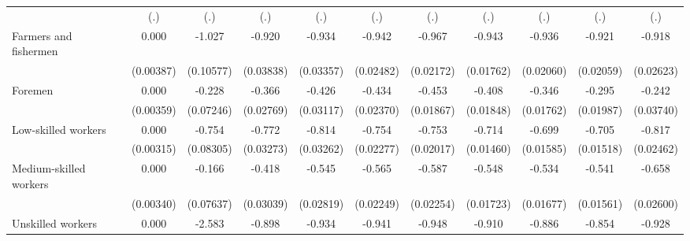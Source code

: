 {\begin{tabular}{l*{10}{c}}
                    &         (.)         &         (.)         &         (.)         &         (.)         &         (.)         &         (.)         &         (.)         &         (.)         &         (.)         &         (.)         \\
Farmers and fishermen&       0.000         &      -1.027\sym{***}&      -0.920\sym{***}&      -0.934\sym{***}&      -0.942\sym{***}&      -0.967\sym{***}&      -0.943\sym{***}&      -0.936\sym{***}&      -0.921\sym{***}&      -0.918\sym{***}\\
                    &   (0.00387)         &   (0.10577)         &   (0.03838)         &   (0.03357)         &   (0.02482)         &   (0.02172)         &   (0.01762)         &   (0.02060)         &   (0.02059)         &   (0.02623)         \\
Foremen             &       0.000         &      -0.228\sym{**} &      -0.366\sym{***}&      -0.426\sym{***}&      -0.434\sym{***}&      -0.453\sym{***}&      -0.408\sym{***}&      -0.346\sym{***}&      -0.295\sym{***}&      -0.242\sym{***}\\
                    &   (0.00359)         &   (0.07246)         &   (0.02769)         &   (0.03117)         &   (0.02370)         &   (0.01867)         &   (0.01848)         &   (0.01762)         &   (0.01987)         &   (0.03740)         \\
Low-skilled workers &       0.000         &      -0.754\sym{***}&      -0.772\sym{***}&      -0.814\sym{***}&      -0.754\sym{***}&      -0.753\sym{***}&      -0.714\sym{***}&      -0.699\sym{***}&      -0.705\sym{***}&      -0.817\sym{***}\\
                    &   (0.00315)         &   (0.08305)         &   (0.03273)         &   (0.03262)         &   (0.02277)         &   (0.02017)         &   (0.01460)         &   (0.01585)         &   (0.01518)         &   (0.02462)         \\
Medium-skilled workers&       0.000         &      -0.166\sym{*}  &      -0.418\sym{***}&      -0.545\sym{***}&      -0.565\sym{***}&      -0.587\sym{***}&      -0.548\sym{***}&      -0.534\sym{***}&      -0.541\sym{***}&      -0.658\sym{***}\\
                    &   (0.00340)         &   (0.07637)         &   (0.03039)         &   (0.02819)         &   (0.02249)         &   (0.02254)         &   (0.01723)         &   (0.01677)         &   (0.01561)         &   (0.02600)         \\
Unskilled workers   &       0.000         &      -2.583\sym{***}&      -0.898\sym{***}&      -0.934\sym{***}&      -0.941\sym{***}&      -0.948\sym{***}&      -0.910\sym{***}&      -0.886\sym{***}&      -0.854\sym{***}&      -0.928\sym{***}\\

\end{tabular}}
